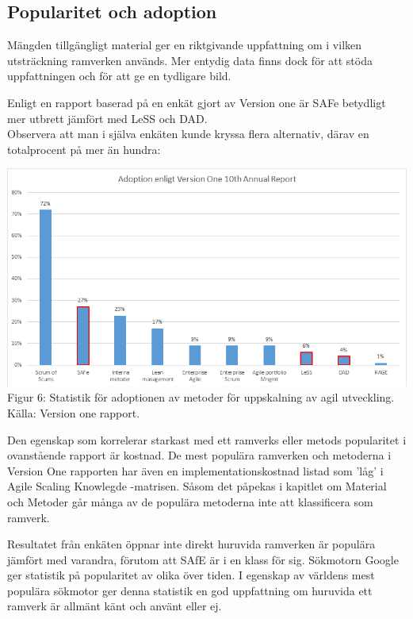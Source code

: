 	

	\subsection{Popularitet och adoption}
	
		Mängden tillgängligt material ger en riktgivande uppfattning om i vilken utsträckning ramverken används. Mer entydig data finns dock för att stöda uppfattningen och för att ge en tydligare bild.
		
		Enligt en rapport baserad på en enkät gjort av Version one är SAFe betydligt mer utbrett jämfört med LeSS och DAD. \cite{version_one_report} \\	
		
		Observera att man i själva enkäten kunde kryssa flera alternativ, därav en totalprocent på mer än hundra:
		
		\begin{center}
			\includegraphics{Grafer/AnnualReport_Adoption.png}
			\\Figur 6: Statistik för adoptionen av metoder för uppskalning av agil utveckling. Källa: Version one rapport. \cite{version_one_report}
		\end{center}
		
	
		Den egenskap som korrelerar starkast med ett ramverks eller metods popularitet i ovanstående rapport är kostnad. De mest populära ramverken och metoderna i Version One rapporten har även en implementationskostnad listad som 'låg' i Agile Scaling Knowlegde -matrisen. \cite{ask_matrix}				
		Såsom det påpekas i kapitlet om Material och Metoder går många av de populära metoderna inte att klassificera som ramverk. 
		
		
		Resultatet från enkäten öppnar inte direkt huruvida ramverken är populära jämfört med varandra, förutom att SAfE är i en klass för sig. Sökmotorn Google ger statistik på popularitet av olika över tiden. I egenskap av världens mest populära sökmotor ger denna statistik en god uppfattning om huruvida ett ramverk är allmänt känt och använt eller ej. 
		
